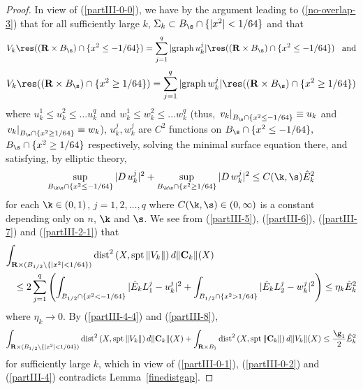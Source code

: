 \documentclass[a4paper,11pt]{amsart}
\begin{document}
\begin{proof}
In view of (\ref{partIII-0-0}), we have by the argument leading to (\ref{no-overlap-3}) that for all sufficiently large $k$,   
$\Sigma_{k} \subset B_{\s} \cap \{|x^{2}| < 1/64\}$ and that
\begin{equation}\label{partIII-5}
 V_{k} \res(({\mathbf R} \times B_{\s}) \cap \{x^{2} \leq -1/64\}) =   \sum_{j=1}^{q} |{\rm graph} \, u_{k}^{j}| \res 
(({\mathbf R} \times B_{\s}) \cap \{x^{2} \leq -1/64\}) \;\;\; {\rm and}
\end{equation}
\begin{equation}\label{partIII-6}
 V_{k} \res(({\mathbf R} \times B_{\s}) \cap \{x^{2} \geq 1/64\}) =   \sum_{j=1}^{q} |{\rm graph} \, w_{k}^{j}| \res 
(({\mathbf R} \times B_{\s}) \cap \{x^{2} \geq 1/64\}) 
\end{equation}
where $u_{k}^{1} \leq u_{k}^{2} \leq \ldots u_{k}^{q}$ and $w_{k}^{1} \leq w_{k}^{2} \leq \ldots w_{k}^{q}$ (thus, $\left.v_{k}\right|_{B_{\s} \cap \{x^{2} \leq -1/64\}} \equiv u_{k}$ and $\left.v_{k}\right|_{B_{\s} \cap \{x^{2} \geq 1/64\}} \equiv w_{k}$), $u_{k}^{j}, w_{k}^{j}$ are $C^{2}$ functions on $B_{\s} \cap \{x^{2} \leq -1/64\},$  
$B_{\s} \cap \{x^{2} \geq 1/64\}$ respectively, solving the minimal surface equation there, and satisfying, by elliptic theory, 
\begin{equation}\label{partIII-7}
\sup_{B_{\k\s}\cap \{x^{2} \leq -1/64\}} |D\, u_{k}^{j}|^{2} + 
\sup_{B_{\k\s}\cap \{x^{2} \geq 1/64\}} |D\, w_{k}^{j}|^{2} \leq C(\k, \s){\hat E}_{k}^{2}
\end{equation}
for each $\k \in (0, 1)$, $j=1,2, \ldots, q$ where $C(\k, \s) \in (0, \infty)$ is a constant depending only on $n$, $\k$ and $\s$. We see from (\ref{partIII-5}), (\ref{partIII-6}), (\ref{partIII-7}) and (\ref{partIII-2-1}) that 
\begin{eqnarray}\label{partIII-8}
\int_{{\mathbf R} \times (B_{1/2} \setminus \{|x^{2}| < 1/64\})} {\rm dist}^{2} \, (X, {\rm spt} \, \|V_{k}\|) \, d\|{\mathbf C}_{k}\|(X)&&\nonumber\\
&&\hspace{-3in} \leq 2\sum_{j=1}^{q}\left(\int_{B_{1/2} \cap \{x^{2} < -1/64\}} |{\hat E}_{k}L_{1}^{j} - u_{k}^{j}|^{2} 
+ \int_{B_{1/2} \cap \{x^{2} > 1/64\}} |{\hat E}_{k} L_{2}^{j} - w_{k}^{j}|^{2}\right) \leq \eta_{k} {\hat E}_{k}^{2}
\end{eqnarray} 
where $\eta_{k} \to 0.$ By (\ref{partIII-4-4}) and (\ref{partIII-8}), 
\begin{equation*}
\int_{{\mathbf R} \times (B_{1/2} \setminus \{|x^{2}| < 1/64\})} {\rm dist}^{2} \, (X, {\rm spt} \, \|V_{k}\|) \, d\|{\mathbf C}_{k}\|(X) + \int_{{\mathbf R} \times B_{1}} {\rm dist}^{2} \, (X, {\rm spt} \, \|{\mathbf C}_{k}\|) \, d\|V_{k}\|(X) \leq \frac{\g_{1}}{2}{\hat E}_{k}^{2}
\end{equation*} 
for sufficiently large $k$, which in view of (\ref{partIII-0-1}), (\ref{partIII-0-2}) and (\ref{partIII-4}) contradicts 
Lemma~\ref{finedistgap}.\end{proof}
\end{document}
